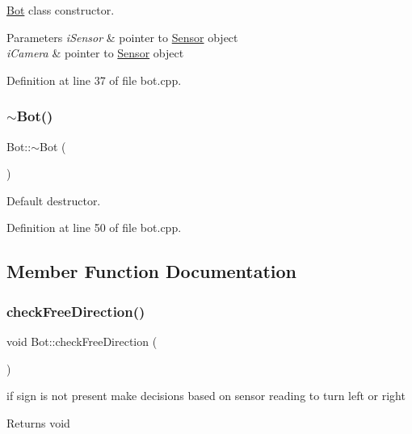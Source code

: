 \mbox{\hyperlink{class_bot}{Bot}} class constructor. 


\begin{DoxyParams}{Parameters}
{\em i\+Sensor} & pointer to \mbox{\hyperlink{class_sensor}{Sensor}} object \\
\hline
{\em i\+Camera} & pointer to \mbox{\hyperlink{class_sensor}{Sensor}} object \\
\hline
\end{DoxyParams}


Definition at line 37 of file bot.\+cpp.

\mbox{\label{class_bot_a4163b0f6c91f94cbeb3145eeda8cd361}} 
\subsubsection{\texorpdfstring{$\sim$\+Bot()}{~Bot()}}
{\footnotesize\ttfamily Bot\+::$\sim$\+Bot (\begin{DoxyParamCaption}{ }\end{DoxyParamCaption})}



Default destructor. 



Definition at line 50 of file bot.\+cpp.



\subsection{Member Function Documentation}
\mbox{\label{class_bot_ab20d03ffaf12e27a1ee84714a3e83950}} 
\subsubsection{\texorpdfstring{check\+Free\+Direction()}{checkFreeDirection()}}
{\footnotesize\ttfamily void Bot\+::check\+Free\+Direction (\begin{DoxyParamCaption}{ }\end{DoxyParamCaption})}



if sign is not present make decisions based on sensor reading to turn left or right 

\begin{DoxyReturn}{Returns}
void 
\end{DoxyReturn}


